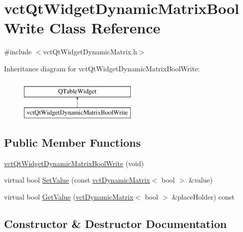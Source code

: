 \hypertarget{classvct_qt_widget_dynamic_matrix_bool_write}{}\section{vct\+Qt\+Widget\+Dynamic\+Matrix\+Bool\+Write Class Reference}
\label{classvct_qt_widget_dynamic_matrix_bool_write}


{\ttfamily \#include $<$vct\+Qt\+Widget\+Dynamic\+Matrix.\+h$>$}

Inheritance diagram for vct\+Qt\+Widget\+Dynamic\+Matrix\+Bool\+Write\+:\begin{figure}[H]
\begin{center}
\leavevmode
\includegraphics[height=2.000000cm]{db/df8/classvct_qt_widget_dynamic_matrix_bool_write}
\end{center}
\end{figure}
\subsection*{Public Member Functions}
\begin{DoxyCompactItemize}
\item 
\hyperlink{classvct_qt_widget_dynamic_matrix_bool_write_a87984c026867122045c67f4f88b708f6}{vct\+Qt\+Widget\+Dynamic\+Matrix\+Bool\+Write} (void)
\item 
virtual bool \hyperlink{classvct_qt_widget_dynamic_matrix_bool_write_ac657c586ab74604974c2906e9609433a}{Set\+Value} (const \hyperlink{classvct_dynamic_matrix}{vct\+Dynamic\+Matrix}$<$ bool $>$ \&value)
\item 
virtual bool \hyperlink{classvct_qt_widget_dynamic_matrix_bool_write_ad01e3f73667d5017fd1c93494a0db295}{Get\+Value} (\hyperlink{classvct_dynamic_matrix}{vct\+Dynamic\+Matrix}$<$ bool $>$ \&place\+Holder) const 
\end{DoxyCompactItemize}


\subsection{Constructor \& Destructor Documentation}
\hypertarget{classvct_qt_widget_dynamic_matrix_bool_write_a87984c026867122045c67f4f88b708f6}{}
